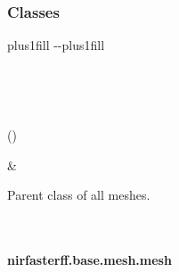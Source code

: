 \documentclass[letterpaper,10pt,english]{sphinxmanual}
\begin{document}
\subsubsection*{Classes}


\begin{savenotes}
\sphinxatlongtablestart
\sphinxthistablewithglobalstyle
\sphinxthistablewithnovlinesstyle
\makeatletter
  \LTleft \@totalleftmargin plus1fill
  \LTright\dimexpr\columnwidth-\@totalleftmargin-\linewidth\relax plus1fill
\makeatother
\begin{longtable}{}
\sphinxtoprule
\endfirsthead

\\
\sphinxtoprule
\endhead

\sphinxbottomrule
{}\\
\endfoot

\endlastfoot
\sphinxtableatstartofbodyhook
\begin{varwidth}[t]{}
\sphinxAtStartPar
{\hyperref[\detokenize{_autosummary/nirfasterff.base.mesh.mesh:nirfasterff.base.mesh.mesh}]{}}()
\sphinxbeforeendvarwidth
\end{varwidth}%
&\begin{varwidth}[t]{}
\sphinxAtStartPar
Parent class of all meshes.
\sphinxbeforeendvarwidth
\end{varwidth}%
\\
\sphinxbottomrule
\end{longtable}
\sphinxtableafterendhook
\sphinxatlongtableend
\end{savenotes}

\sphinxstepscope


\paragraph{nirfasterff.base.mesh.mesh}
\label{\detokenize{_autosummary/nirfasterff.base.mesh.mesh:nirfasterff-base-mesh-mesh}}\label{\detokenize{_autosummary/nirfasterff.base.mesh.mesh::doc}}
\end{document}
